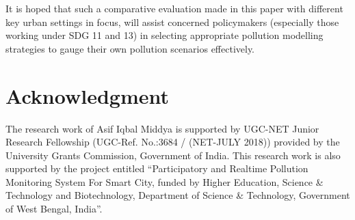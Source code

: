 \documentclass[10pt,journal]{IEEEtran}
\begin{document}
It is hoped that such a comparative evaluation made in this paper with different key urban settings in focus, will assist concerned policymakers (especially those working under SDG 11 and 13) in selecting appropriate pollution modelling strategies to gauge their own pollution scenarios effectively. 

\section*{Acknowledgment}
The research work of Asif Iqbal Middya is supported by UGC-NET Junior Research Fellowship (UGC-Ref. No.:3684 / (NET-JULY 2018)) provided by the University Grants Commission, Government of India. This research work is also supported by the project entitled ``Participatory and Realtime Pollution Monitoring System For Smart City, funded by Higher Education, Science \& Technology and Biotechnology, Department of Science \& Technology, Government of West Bengal, India''.  

\ifCLASSOPTIONcaptionsoff
  \newpage
\fi



\end{document}

